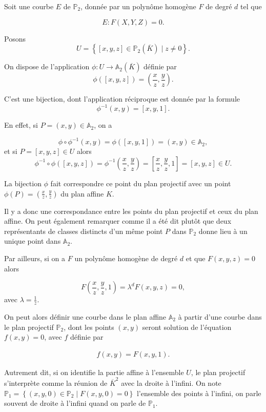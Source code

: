Soit une courbe $E$ de $\mathbb{P}_{2}$, donnée par un
polynôme homogène $F$ de degré $d$ tel que 

\[
E : F(X,Y,Z)=0
.\] 

Posons 
\[
U = \left\{ [x,y,z] \in \mathbb{P}_{2}(\overline{K}) \mid z \neq 0 \right\} 
.\] 

On dispose de l'application $\phi : U \to \mathbb{A}_{2}(\overline{K})$ définie par
\[
\phi([x,y,z])=\left( \frac{x}{z},\frac{y}{z} \right) 
.\] 

C'est une bijection, dont l'application réciproque est donnée par la formule
\[
\phi^{-1}(x,y)=\left[ x,y,1 \right] 
.\] 

En effet, si $P = (x,y) \in \mathbb{A}_{2}$, on a

\[
\phi \circ \phi^{-1} (x,y) = \phi([x,y,1]) = (x,y) \in \mathbb{A}_{2}
,\] 
et si $P = [x,y,z] \in U$ alors
\[
\phi^{-1} \circ \phi ([x,y,z]) = \phi^{-1}(\frac{x}{z},\frac{y}{z}) = [\frac{x}{z},\frac{y}{z},1] =
[x,y,z] \in U
.\] 

La bijection $\phi$ fait correspondre ce point du plan projectif avec un point
$\phi(P) = (\frac{x}{z},\frac{y}{z})$ du plan affine $K$. 

Il y a donc une correspondance entre les points du plan projectif et ceux du plan affine.
On peut également remarquer comme il a été dit plutôt que deux représentants de classes
distincts d'un même point $P$ dans $\mathbb{P}_{2}$ donne lieu à un unique point dans
$\mathbb{A}_{2}$.

Par ailleurs, si on a $F$ un polynôme homogène de degré $d$ et que $F(x,y,z) = 0$ alors 

\[
F(\frac{x}{z},\frac{y}{z},1) = \lambda^{d} F(x,y,z) = 0
,\] 
avec $\lambda = \frac{1}{z}$.

On peut alors définir une courbe dans le plan affine $\mathbb{A}_{2}$ à partir d'une
courbe dans le plan projectif $\mathbb{P}_{2}$, dont les points $(x,y)$ seront solution de
l'équation $f(x,y) = 0$, avec $f$ définie par

\begin{align}
    \label{eq:bijectionP2}
    f(x,y) = F(x,y,1)
.\end{align}


Autrement dit, si on identifie la partie affine à l'ensemble $U$, le plan projectif s'interprète comme la
réunion de $\overline{K}^2$ avec la droite à l'infini.
On note $\mathbb{P}_{1} = \left\{ (x,y,0) \in \mathbb{P}_{2} \mid F(x,y,0) = 0 \right\} $
l'ensemble des points à l'infini, on parle souvent de droite à l'infini quand on parle de
$\mathbb{P}_{1}$.

